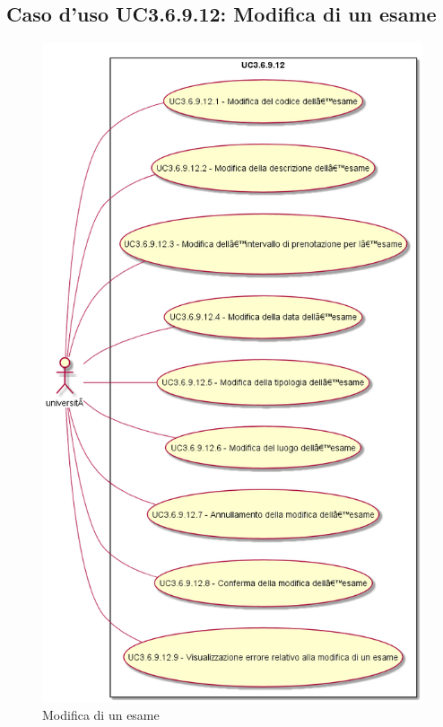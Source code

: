 \subsection{Caso d'uso \texorpdfstring{UC3.6.9.12}{UC3.6.9.12}: Modifica di un esame}
\begin{figure} [H]
\centering
\includegraphics[scale=0.45]{./img/UC3-6-9-12.png}
\caption{Modifica di un esame}\label{}
\end{figure}
